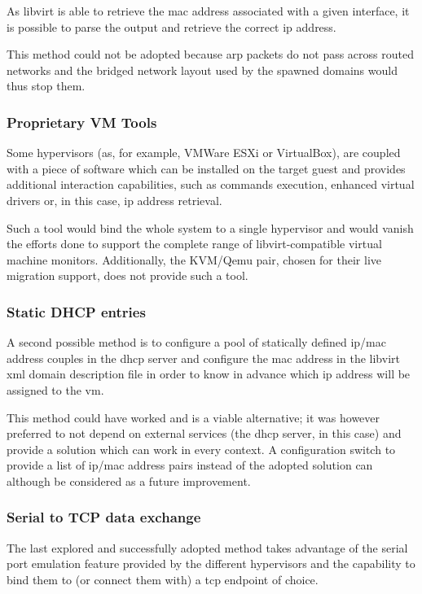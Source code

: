 As libvirt is able to retrieve the \gls{mac} address associated with a given interface, it is possible to parse the output and retrieve the correct \gls{ip} address.

This method could not be adopted because \gls{arp} packets do not pass across routed networks and the bridged network layout used by the spawned domains would thus stop them.

\subsubsection{Proprietary VM Tools}

Some hypervisors (as, for example, VMWare ESXi or VirtualBox), are coupled with a piece of software which can be installed on the target guest and provides additional interaction capabilities, such as commands execution, enhanced virtual drivers or, in this case, \gls{ip} address retrieval.

Such a tool would bind the whole system to a single hypervisor and would vanish the efforts done to support the complete range of libvirt-compatible virtual machine monitors. Additionally, the KVM/Qemu pair, chosen for their live migration support, does not provide such a tool.

\subsubsection{Static DHCP entries}

A second possible method is to configure a pool of statically defined \gls{ip}/\gls{mac} address couples in the \gls{dhcp} server and configure the \gls{mac} address in the libvirt \gls{xml} domain description file in order to know in advance which \gls{ip} address will be assigned to the \gls{vm}.

This method could have worked and is a viable alternative; it was however preferred to not depend on external services (the \gls{dhcp} server, in this case) and provide a solution which can work in every context. A configuration switch to provide a list of \gls{ip}/\gls{mac} address pairs instead of the adopted solution can although be considered as a future improvement.

\subsubsection{Serial to TCP data exchange}
\label{sec:serial-tcp-ip}

The last explored and successfully adopted method takes advantage of the serial port emulation feature provided by the different hypervisors and the capability to bind them to (or connect them with) a \gls{tcp} endpoint of choice.

